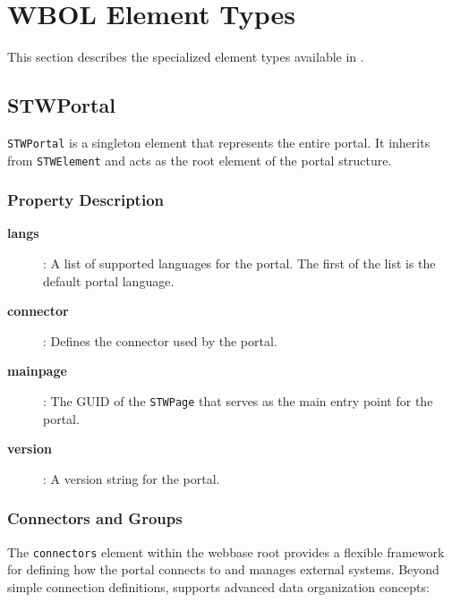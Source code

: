 \section{WBOL Element Types}
\label{sec:wbol-element-types}

This section describes the specialized element types available in \wbol{}.

\subsection{STWPortal}

\texttt{STWPortal} is a singleton element that represents the entire portal. It inherits from \texttt{STWElement} and acts as the root element of the portal structure.

\subsubsection{Property Description}

\begin{description}
\item[\textbf{langs}]: A list of supported languages for the portal. The first of the list is the default portal language.
\item[\textbf{connector}]: Defines the connector used by the portal.
\item[\textbf{mainpage}]: The GUID of the \texttt{STWPage} that serves as the main entry point for the portal.
\item[\textbf{version}]: A version string for the portal.
\end{description}

\subsubsection{Connectors and Groups}
\label{sec:connector-groups}

The \texttt{connectors} element within the webbase root provides a flexible framework for defining how the portal connects to and manages external systems. Beyond simple connection definitions, \wbol{} supports advanced data organization concepts:


